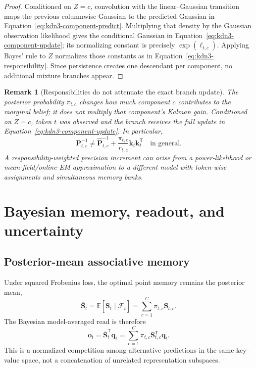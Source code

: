 \documentclass[11pt]{article}
\newcommand{\ve}[1]{\boldsymbol{#1}}
\newcommand{\tr}{\mathsf{T}}
\newcommand{\E}{\mathbb{E}}
\newtheorem{remark}{Remark}
\begin{document}
\begin{proof}
Conditioned on $Z=c$, convolution with the linear--Gaussian transition maps the previous
columnwise Gaussian to the predicted Gaussian in Equation~\eqref{eq:kdn3-component-predict}.
Multiplying that density by the Gaussian observation likelihood gives the conditional Gaussian
in Equation~\eqref{eq:kdn3-component-update}; its normalizing constant is precisely
$\exp(\ell_{t,c})$.  Applying Bayes' rule to $Z$ normalizes those constants as in
Equation~\eqref{eq:kdn3-responsibility}.  Since persistence creates one descendant per component,
no additional mixture branches appear.
\end{proof}

\begin{remark}[Responsibilities do not attenuate the exact branch update]
\label{rem:kdn3-no-fractional-write}
The posterior probability $\pi_{t,c}$ changes how much component $c$ contributes to the marginal
belief; it does not multiply that component's Kalman gain.  Conditioned on $Z=c$, token $t$ was
observed and the branch receives the full update in Equation~\eqref{eq:kdn3-component-update}.
In particular,
\begin{equation}
  \ve{P}_{t,c}^{-1}
  \ne
  \widehat{\ve{P}}_{t,c}^{-1}
  +\frac{\pi_{t,c}}{r_{t,c}}\ve{k}_t\ve{k}_t^{\tr}
  \quad\text{in general}.
  \label{eq:kdn3-not-fractional-update}
\end{equation}
A responsibility-weighted precision increment can arise from a power-likelihood or
mean-field/online-EM approximation to a different model with token-wise assignments and
simultaneous memory banks.
\end{remark}

\section{Bayesian memory, readout, and uncertainty}
\label{sec:kdn3-mixture-moments}

\subsection{Posterior-mean associative memory}

Under squared Frobenius loss, the optimal point memory remains the posterior mean,
\begin{equation}
  \overline{\ve{S}}_t
  =\E[\widetilde{\ve{S}}_t\mid\mathcal{F}_t]
  =\sum_{c=1}^{C}\pi_{t,c}\ve{S}_{t,c}.
  \label{eq:kdn3-mixture-mean-memory}
\end{equation}
The Bayesian model-averaged read is therefore
\begin{equation}
  \ve{o}_t
  =\overline{\ve{S}}_t^{\tr}\ve{q}_t
  =\sum_{c=1}^{C}\pi_{t,c}\ve{S}_{t,c}^{\tr}\ve{q}_t.
  \label{eq:kdn3-mixture-read}
\end{equation}
This is a normalized competition among alternative predictions in the same key--value space, not
a concatenation of unrelated representation subspaces.
\end{document}
